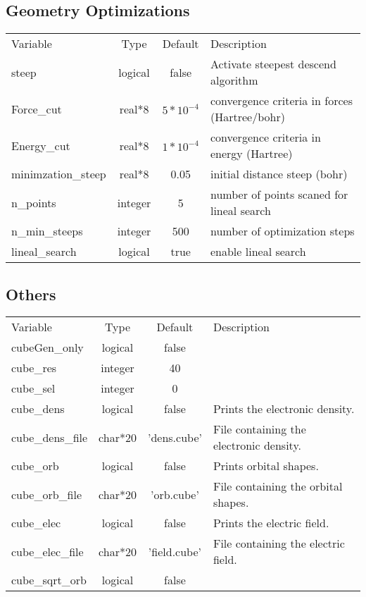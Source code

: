 \documentclass[journal=jctcce,manuscript=article]{achemso}
\begin{document}
    \subsection{Geometry Optimizations}
    \begin{table}  [H]
      \begin{center}
      \begin{tabular}{ l c c l}
         Variable & Type & Default & Description \\
         steep & logical & false & Activate steepest descend algorithm \\
         Force\_cut & real*8 & $5 * 10^{-4}$ & convergence criteria in forces (Hartree/bohr)\\
         Energy\_cut & real*8 & $1 * 10^{-4}$& convergence criteria in energy (Hartree)\\
         minimzation\_steep & real*8 & 0.05 & initial distance steep (bohr)\\
         n\_points & integer & 5 & number of points scaned for lineal search \\
         n\_min\_steeps  &  integer & 500 & number of optimization steps\\
         lineal\_search & logical & true & enable lineal search\\
       \end{tabular}
       \end{center}
      \label{geom.optim}
    \end{table} 
    
    \subsection{Others}
    \begin{table}  [H]
      \begin{center}
      \begin{tabular}{ l c c l}
         Variable & Type & Default & Description \\
         cubeGen\_only & logical & false & \\
         cube\_res & integer & 40 & \\
         cube\_sel & integer & 0 & \\
         cube\_dens & logical & false & Prints the electronic density.  \\
         cube\_dens\_file & char*20 & 'dens.cube' & File containing the electronic density. \\
         cube\_orb & logical & false & Prints orbital shapes. \\
         cube\_orb\_file & char*20 & 'orb.cube' & File containing the orbital shapes. \\
         cube\_elec & logical & false & Prints the electric field. \\
         cube\_elec\_file & char*20 & 'field.cube' & File containing the electric field. \\
         cube\_sqrt\_orb & logical & false & \\
       \end{tabular}
       \end{center}
      \label{lio.ecp.var.1}
    \end{table}    
    
\end{document}
